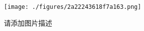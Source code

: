 
\begin{issues}
\issueDraft
\end{issues}

\begin{figure}[ht]
\centering
\texttt{[image: ./figures/2a22243618f7a163.png]}
\caption{请添加图片描述} \label{fig_PhText_1}
\end{figure}

